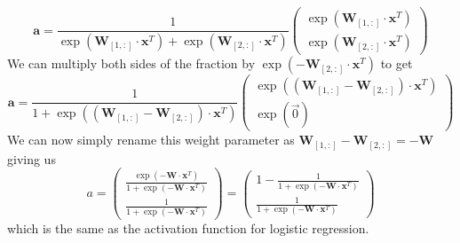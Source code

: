 \documentclass[11pt,a4paper,titlepage]{article}
\begin{document}
\begin{equation}
\textbf{a} = \frac{1}{ \exp(\textbf{W}_{[1,:]}\cdot \textbf{x}^T)  + \exp( \textbf{W}_{[2,:]} \cdot \textbf{x}^T ) }
\begin{pmatrix}
\exp( \textbf{W}_{[1,:]} \cdot \textbf{x}^T) \\
\exp( \textbf{W}_{[2,:]} \cdot \textbf{x}^T)
\end{pmatrix}
\end{equation}
We can multiply both sides of the fraction by $\exp(- \textbf{W}_{[2,:]} \cdot \textbf{x}^T)$ to get
\begin{equation}
\textbf{a} = \frac{1}{ 1  + \exp( (\textbf{W}_{[1,:]} -\textbf{W}_{[2,:]})\cdot \textbf{x}^T) }
\begin{pmatrix}
\exp( (\textbf{W}_{[1,:]} -\textbf{W}_{[2,:]})\cdot \textbf{x}^T) \\
\exp( \vec{0})
\end{pmatrix}
\end{equation}
We can now simply rename this weight parameter as $\textbf{W}_{[1,:]} -\textbf{W}_{[2,:]} = -\textbf{W}$ giving us
\begin{equation}
a = \begin{pmatrix}
\frac{\exp( -\textbf{W}\cdot \textbf{x}^T)}{1+\exp( -\textbf{W}\cdot \textbf{x}^T)} \\
\frac{1}{1+ \exp( -\textbf{W}\cdot \textbf{x}^T)}
\end{pmatrix} = \begin{pmatrix}
1-\frac{1}{1+\exp( -\textbf{W}\cdot \textbf{x}^T)} \\
\frac{1}{1+ \exp( -\textbf{W}\cdot \textbf{x}^T)}
\end{pmatrix} 
\end{equation}
which is the same as the activation function for logistic regression.
\end{document}
